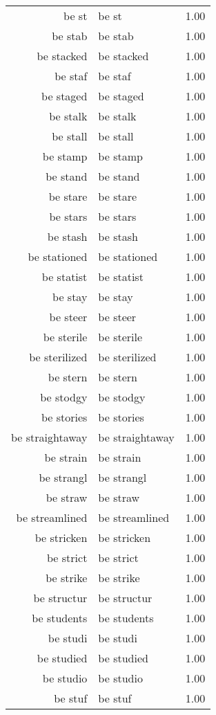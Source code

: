 \begin{table}[ht]
\begin{tabular}{rlr}
  be st & be st & 1.00 \\ 
  be stab & be stab & 1.00 \\ 
  be stacked & be stacked & 1.00 \\ 
  be staf & be staf & 1.00 \\ 
  be staged & be staged & 1.00 \\ 
  be stalk & be stalk & 1.00 \\ 
  be stall & be stall & 1.00 \\ 
  be stamp & be stamp & 1.00 \\ 
  be stand & be stand & 1.00 \\ 
  be stare & be stare & 1.00 \\ 
  be stars & be stars & 1.00 \\ 
  be stash & be stash & 1.00 \\ 
  be stationed & be stationed & 1.00 \\ 
  be statist & be statist & 1.00 \\ 
  be stay & be stay & 1.00 \\ 
  be steer & be steer & 1.00 \\ 
  be sterile & be sterile & 1.00 \\ 
  be sterilized & be sterilized & 1.00 \\ 
  be stern & be stern & 1.00 \\ 
  be stodgy & be stodgy & 1.00 \\ 
  be stories & be stories & 1.00 \\ 
  be straightaway & be straightaway & 1.00 \\ 
  be strain & be strain & 1.00 \\ 
  be strangl & be strangl & 1.00 \\ 
  be straw & be straw & 1.00 \\ 
  be streamlined & be streamlined & 1.00 \\ 
  be stricken & be stricken & 1.00 \\ 
  be strict & be strict & 1.00 \\ 
  be strike & be strike & 1.00 \\ 
  be structur & be structur & 1.00 \\ 
  be students & be students & 1.00 \\ 
  be studi & be studi & 1.00 \\ 
  be studied & be studied & 1.00 \\ 
  be studio & be studio & 1.00 \\ 
  be stuf & be stuf & 1.00 \\ 

\end{tabular}
\end{table}
